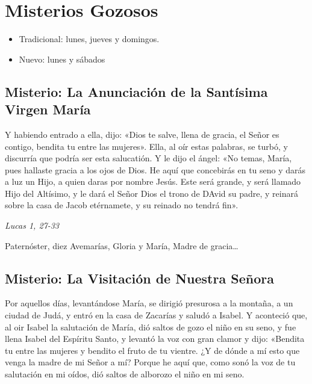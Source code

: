 \documentclass[./rosary.tex]{subfiles}
\newcounter{joyful-counter}
\begin{document}
\section*{Misterios Gozosos}

\begin{itemize}
      \item Tradicional: lunes, jueves y domingos.
      \item Nuevo: lunes y sábados
\end{itemize}

\subsection*{ Misterio: La Anunciación de la Santísima Virgen María}
Y habiendo entrado a ella, dijo: «Dios te salve, llena de gracia, el Señor es contigo, bendita tu entre las mujeres».
Ella, al oír estas palabras, se turbó, y discurría que podría ser esta salucatión. Y le dijo el ángel: «No temas, María,
pues hallaste gracia a los ojos de Dios. He aquí que concebirás en tu seno y darás a luz un Hijo, a quien daras por
nombre Jesús. Este será grande, y será llamado Hijo del Altísimo, y le dará el Señor Dios el trono de DAvid su padre,
y reinará sobre la casa de Jacob etérnamete, y su reinado no tendrá fin».

\begin{flushright}
      \emph{Lucas 1, 27-33}
\end{flushright}

Paternóster, diez Avemarías, Gloria y María, Madre de gracia{\ldots}

\bigskip

\subsection*{ Misterio: La Visitación de Nuestra Señora}

Por aquellos días, levantándose María, se dirigió presurosa a la montaña, a un ciudad de Judá, y entró en la casa de Zacarías y saludó a Isabel.
Y aconteció que, al oir Isabel la salutación de María, dió saltos de gozo el niño en su seno, y fue llena Isabel del Espíritu Santo,
y levantó la voz con gran clamor y dijo: «Bendita tu entre las mujeres y bendito el fruto de tu vientre. ¿Y de dónde a mí esto que venga la madre de mi Señor a mí?
Porque he aquí que, como sonó la voz de tu salutación en mi oídos, dió saltos de alborozo el niño en mi seno.
\end{document}
